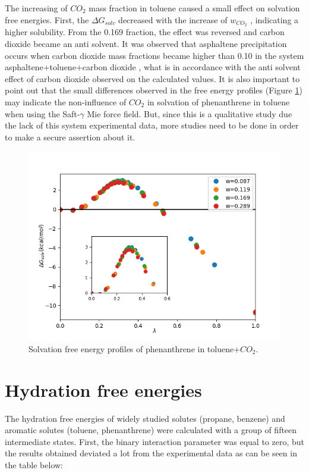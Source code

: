 The increasing of $CO_{2}$ mass fraction in toluene caused a small effect on solvation free energies. First, the $\Delta G_{solv}$ decreased with the increase of $w_{CO_{2}}$ , indicating a higher solubility. From the 0.169 fraction, the effect was reversed and carbon dioxide became an anti solvent. It was observed that asphaltene precipitation occurs when carbon dioxide mass fractions became higher than 0.10 in the system asphaltene+toluene+carbon dioxide \cite{SOROUSH2014405}, what is in accordance with the anti solvent effect of carbon dioxide observed on the calculated values. It is also important to point out that the small differences observed in the free energy profiles (Figure \ref{fig:Figure_1}) may indicate the non-influence of $CO_{2}$ in solvation of phenanthrene in toluene when using the Saft-$\gamma$ Mie force field. But, since this is a qualitative study due the lack of this system experimental data, more studies need to be done in order to make a secure assertion about it.   

\begin{figure}[H]
\centering
\includegraphics[width=0.9\linewidth]{Figures/Figure_1}
\caption{Solvation free energy profiles of phenanthrene in toluene+$CO_{2}$.}
\label{fig:Figure_1}
\end{figure}


\section{Hydration free energies}

The hydration free energies of widely studied solutes (propane, benzene) and aromatic solutes (toluene, phenanthrene) were calculated with a group of fifteen intermediate states. First, the binary interaction parameter was equal to zero, but the results obtained deviated a lot from the experimental data as can be seen in the table below:

